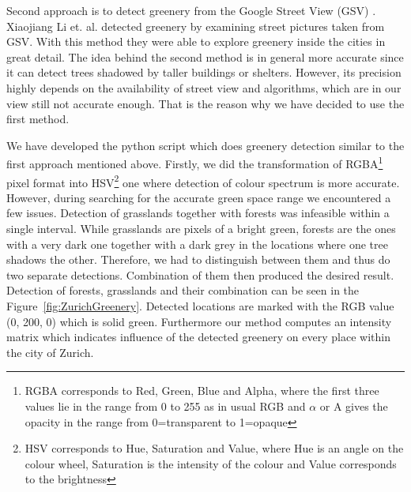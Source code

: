 \documentclass[letterpaper]{article}
\begin{document}
\indent Second approach is to detect greenery from the Google Street View (GSV) \cite{googleView}. Xiaojiang Li et. al. detected greenery by examining street
pictures taken from GSV. With this method they were able to explore greenery inside the cities in great detail. The idea behind the second method is in general
more accurate since it can detect trees shadowed by taller buildings or shelters. However, its precision highly depends on the availability of street view and
algorithms, which are in our view still not accurate enough. That is the reason why we have decided to use the first method.

\indent We have developed the python script which does greenery detection similar to the first approach mentioned above.
Firstly, we did the transformation of RGBA\footnote{RGBA corresponds to Red, Green, Blue and Alpha, where the first three values lie in the range from 0 to 255 as in usual RGB and $\alpha$ or A gives the opacity in the range from 0=transparent to 1=opaque} pixel format into HSV\footnote{HSV corresponds to Hue, Saturation and Value, where Hue is an angle on the colour wheel, Saturation is the intensity of the colour and Value corresponds to the brightness} one where detection of colour spectrum is more accurate.
However, during searching for the accurate green space range we encountered a few issues. Detection of grasslands together
with forests was infeasible within a single interval. While grasslands are pixels of a bright green, forests are
the ones with a very dark one together with a dark grey in the locations where one tree shadows the other.
Therefore, we had to distinguish between them and thus do two separate detections. Combination of them then
produced the desired result. Detection of forests, grasslands and their combination can be seen in the Figure~\ref{fig:ZurichGreenery}.
Detected locations are marked with the RGB value (0, 200, 0) which is solid green. Furthermore our method computes an intensity matrix
which indicates influence of the detected greenery on every place within the city of Zurich.
\end{document}
